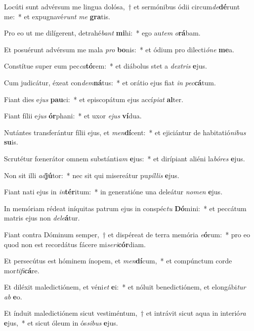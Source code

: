 \item Locúti sunt advérsum me lingua dolósa,~† et sermónibus ódii circum\textit{de}\textbf{dé}runt me:~* et expugnavé\textit{runt} \textit{me} \textbf{gra}tis.
\item Pro eo ut me dilígerent, detrahé\textit{bant} \textbf{mi}hi:~* ego au\textit{tem} \textit{o}\textbf{rá}bam.
\item Et posuérunt advérsum me mala \textit{pro} \textbf{bo}nis:~* et ódium pro dilecti\textit{ó}\textit{ne} \textbf{me}a.
\item Constítue super eum pec\textit{ca}\textbf{tó}rem:~* et diábolus stet a \textit{dex}\textit{tris} \textbf{e}jus.
\item Cum judicátur, éxeat con\textit{dem}\textbf{ná}tus:~* et orátio ejus fiat \textit{in} \textit{pec}\textbf{cá}tum.
\item Fiant dies e\textit{jus} \textbf{pau}ci:~* et episcopátum ejus accí\textit{pi}\textit{at} \textbf{al}ter.
\item Fiant fílii e\textit{jus} \textbf{ór}phani:~* et uxor \textit{e}\textit{jus} \textbf{ví}dua.
\item Nutántes transferántur fílii ejus, et \textit{men}\textbf{dí}cent:~* et ejiciántur de habitatió\textit{ni}\textit{bus} \textbf{su}is.
\item Scrutétur fœnerátor omnem substánti\textit{am} \textbf{e}jus:~* et dirípiant aliéni la\textit{bó}\textit{res} \textbf{e}jus.
\item Non sit illi \textit{ad}\textbf{jú}tor:~* nec sit qui misereátur pu\textit{píl}\textit{lis} \textbf{e}jus.
\item Fiant nati ejus in \textit{in}\textbf{tér}itum:~* in generatióne una deleátur \textit{no}\textit{men} \textbf{e}jus.
\item In memóriam rédeat iníquitas patrum ejus in conspéc\textit{tu} \textbf{Dó}mini:~* et peccátum matris ejus non \textit{de}\textit{le}\textbf{á}tur.
\item Fiant contra Dóminum semper,~† et dispéreat de terra memória \textit{e}\textbf{ó}rum:~* pro eo quod non est recordátus fácere mi\textit{se}\textit{ri}\textbf{cór}diam.
\item Et persecútus est hóminem ínopem, et \textit{men}\textbf{dí}cum,~* et compúnctum corde mor\textit{ti}\textit{fi}\textbf{cá}re.
\item Et diléxit maledictiónem, et véni\textit{et} \textbf{e}i:~* et nóluit benedictiónem, et elongábi\textit{tur} \textit{ab} \textbf{e}o.
\item Et índuit maledictiónem sicut vestiméntum,~† et intrávit sicut aqua in interió\textit{ra} \textbf{e}jus,~* et sicut óleum in ós\textit{si}\textit{bus} \textbf{e}jus.
